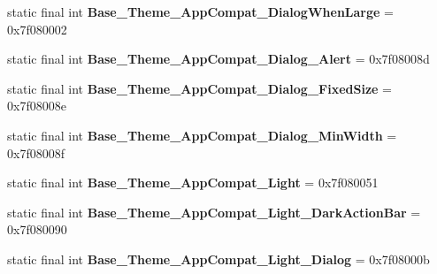 \begin{DoxyCompactItemize}
\item 
\hypertarget{classandroid_1_1support_1_1design_1_1_r_1_1style_a13ba16ca33b97a860d5376eb50a4a4cf}{}static final int {\bfseries Base\+\_\+\+Theme\+\_\+\+App\+Compat\+\_\+\+Dialog\+When\+Large} = 0x7f080002\label{classandroid_1_1support_1_1design_1_1_r_1_1style_a13ba16ca33b97a860d5376eb50a4a4cf}

\item 
\hypertarget{classandroid_1_1support_1_1design_1_1_r_1_1style_a050729902da0b8b24cc910dd938eef5d}{}static final int {\bfseries Base\+\_\+\+Theme\+\_\+\+App\+Compat\+\_\+\+Dialog\+\_\+\+Alert} = 0x7f08008d\label{classandroid_1_1support_1_1design_1_1_r_1_1style_a050729902da0b8b24cc910dd938eef5d}

\item 
\hypertarget{classandroid_1_1support_1_1design_1_1_r_1_1style_abb3e972d5a6c0584b50249b06d8480be}{}static final int {\bfseries Base\+\_\+\+Theme\+\_\+\+App\+Compat\+\_\+\+Dialog\+\_\+\+Fixed\+Size} = 0x7f08008e\label{classandroid_1_1support_1_1design_1_1_r_1_1style_abb3e972d5a6c0584b50249b06d8480be}

\item 
\hypertarget{classandroid_1_1support_1_1design_1_1_r_1_1style_aac1d079153dc508f7d8f6b0c2469e8a3}{}static final int {\bfseries Base\+\_\+\+Theme\+\_\+\+App\+Compat\+\_\+\+Dialog\+\_\+\+Min\+Width} = 0x7f08008f\label{classandroid_1_1support_1_1design_1_1_r_1_1style_aac1d079153dc508f7d8f6b0c2469e8a3}

\item 
\hypertarget{classandroid_1_1support_1_1design_1_1_r_1_1style_aec318d3a8e9ecefd9031f08ae588d966}{}static final int {\bfseries Base\+\_\+\+Theme\+\_\+\+App\+Compat\+\_\+\+Light} = 0x7f080051\label{classandroid_1_1support_1_1design_1_1_r_1_1style_aec318d3a8e9ecefd9031f08ae588d966}

\item 
\hypertarget{classandroid_1_1support_1_1design_1_1_r_1_1style_a9ddf73b77f2f311699b8f3b865849ef2}{}static final int {\bfseries Base\+\_\+\+Theme\+\_\+\+App\+Compat\+\_\+\+Light\+\_\+\+Dark\+Action\+Bar} = 0x7f080090\label{classandroid_1_1support_1_1design_1_1_r_1_1style_a9ddf73b77f2f311699b8f3b865849ef2}

\item 
\hypertarget{classandroid_1_1support_1_1design_1_1_r_1_1style_af5d45129d3e4af93a8217238dfafaf78}{}static final int {\bfseries Base\+\_\+\+Theme\+\_\+\+App\+Compat\+\_\+\+Light\+\_\+\+Dialog} = 0x7f08000b\label{classandroid_1_1support_1_1design_1_1_r_1_1style_af5d45129d3e4af93a8217238dfafaf78}


\end{DoxyCompactItemize}
